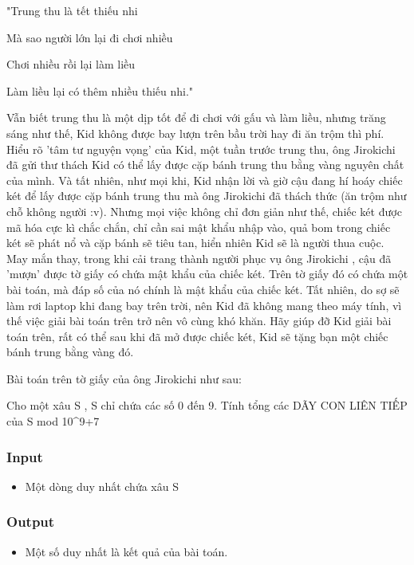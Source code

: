 

"Trung thu là tết thiếu nhi

Mà sao người lớn lại đi chơi nhiều

Chơi nhiều rồi lại làm liều

Làm liều lại có thêm nhiều thiếu nhi."

Vẫn biết trung thu là một dịp tốt để đi chơi với gấu và làm liều, nhưng trăng sáng như thế, Kid không được bay lượn trên bầu trời hay đi ăn trộm thì phí. Hiểu rõ 'tâm tư nguyện vọng' của Kid, một tuần trước trung thu, ông Jirokichi đã gửi thư thách Kid có thể lấy được cặp bánh trung thu bằng vàng nguyên chất của mình. Và tất nhiên, như mọi khi, Kid nhận lời và giờ cậu đang hí hoáy chiếc két để lấy được cặp bánh trung thu mà ông Jirokichi đã thách thức (ăn trộm như chỗ không người :v). Nhưng mọi việc không chỉ đơn giản như thế, chiếc két được mã hóa cực kì chắc chắn, chỉ cần sai mật khẩu nhập vào, quả bom trong chiếc két sẽ phát nổ và cặp bánh sẽ tiêu tan, hiển nhiên Kid sẽ là người thua cuộc. May mắn thay, trong khi cải trang thành người phục vụ ông Jirokichi , cậu đã 'mượn' được tờ giấy có chứa mật khẩu của chiếc két. Trên tờ giấy đó có chứa một bài toán, mà đáp số của nó chính là mật khẩu của chiếc két. Tất nhiên, do sợ sẽ làm rơi laptop khi đang bay trên trời, nên Kid đã không mang theo máy tính, vì thế việc giải bài toán trên trở nên vô cùng khó khăn. Hãy giúp đỡ Kid giải bài toán trên, rất có thể sau khi đã mở được chiếc két, Kid sẽ tặng bạn một chiếc bánh trung bằng vàng đó.

Bài toán trên tờ giấy của ông Jirokichi như sau:

Cho một xâu S , S chỉ chứa các số 0 đến 9. Tính tổng các DÃY CON LIÊN TIẾP của S mod 10^9+7

\subsubsection{Input}
\begin{itemize}
	\item Một dòng duy nhất chứa xâu S
\end{itemize}

\subsubsection{Output}
\begin{itemize}
	\item Một số duy nhất là kết quả của bài toán.
\end{itemize}

